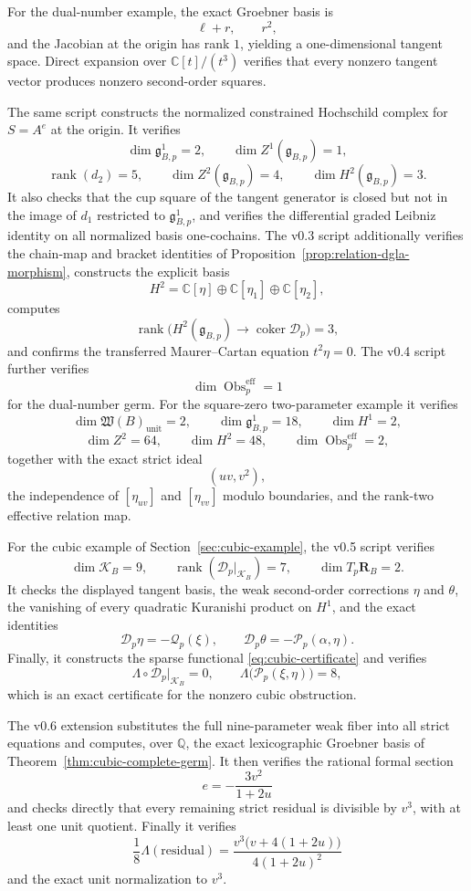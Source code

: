 \documentclass[11pt]{amsart}
\newcommand{\coker}{\operatorname{coker}}
\newcommand{\rank}{\operatorname{rank}}
\newcommand{\Obs}{\operatorname{Obs}}
\newcommand{\Wfib}{\mathfrak W}
\newcommand{\cD}{\mathscr D}
\newcommand{\cQ}{\mathscr Q}
\newcommand{\cP}{\mathscr P}
\newcommand{\C}{\mathbb C}
\newcommand{\Q}{\mathbb Q}
\newcommand{\ghoch}{\mathfrak g}
\begin{document}
For the dual-number example, the exact Groebner basis is
\[
\ell+r,\qquad r^2,
\]
and the Jacobian at the origin has rank $1$, yielding a one-dimensional tangent space.  Direct expansion over $\C[t]/(t^3)$ verifies that every nonzero tangent vector produces nonzero second-order squares.

The same script constructs the normalized constrained Hochschild complex for $S=A^e$ at the origin.  It verifies
\[
\dim\ghoch^1_{B,p}=2,
\qquad
\dim Z^1(\ghoch_{B,p})=1,
\]
\[
\rank(d_2)=5,
\qquad
\dim Z^2(\ghoch_{B,p})=4,
\qquad
\dim H^2(\ghoch_{B,p})=3.
\]
It also checks that the cup square of the tangent generator is closed but not in the image of $d_1$ restricted to $\ghoch^1_{B,p}$, and verifies the differential graded Leibniz identity on all normalized basis one-cochains.  The v0.3 script additionally verifies the chain-map and bracket identities of Proposition~\ref{prop:relation-dgla-morphism}, constructs the explicit basis
\[
H^2=\C[\eta]\oplus\C[\eta_1]\oplus\C[\eta_2],
\]
computes
\[
\rank\bigl(H^2(\ghoch_{B,p})\to\coker\cD_p\bigr)=3,
\]
and confirms the transferred Maurer--Cartan equation $t^2\eta=0$.  The v0.4 script further verifies
\[
\dim\Obs^{\mathrm{eff}}_p=1
\]
for the dual-number germ.  For the square-zero two-parameter example it verifies
\[
\dim\Wfib(B)_{\mathrm{unit}}=2,
\qquad
\dim\ghoch^1_{B,p}=18,
\qquad
\dim H^1=2,
\]
\[
\dim Z^2=64,
\qquad
\dim H^2=48,
\qquad
\dim\Obs^{\mathrm{eff}}_p=2,
\]
together with the exact strict ideal
\[
(uv,v^2),
\]
the independence of $[\eta_{uv}]$ and $[\eta_{vv}]$ modulo boundaries, and the rank-two effective relation map.

For the cubic example of Section~\ref{sec:cubic-example}, the v0.5 script verifies
\[
\dim\mathcal K_B=9,
\qquad
\rank(\cD_p|_{\mathcal K_B})=7,
\qquad
\dim T_p\mathbf R_B=2.
\]
It checks the displayed tangent basis, the weak second-order corrections $\eta$ and $\theta$, the vanishing of every quadratic Kuranishi product on $H^1$, and the exact identities
\[
\cD_p\eta=-\cQ_p(\xi),
\qquad
\cD_p\theta=-\cP_p(\alpha,\eta).
\]
Finally, it constructs the sparse functional \eqref{eq:cubic-certificate} and verifies
\[
\Lambda\circ\cD_p|_{\mathcal K_B}=0,
\qquad
\Lambda\bigl(\cP_p(\xi,\eta)\bigr)=8,
\]
which is an exact certificate for the nonzero cubic obstruction.


The v0.6 extension substitutes the full nine-parameter weak fiber into all strict equations and computes, over $\Q$, the exact lexicographic Groebner basis of Theorem~\ref{thm:cubic-complete-germ}.  It then verifies the rational formal section
\[
e=-\frac{3v^2}{1+2u}
\]
and checks directly that every remaining strict residual is divisible by $v^3$, with at least one unit quotient.  Finally it verifies
\[
\frac18\Lambda(\text{residual})
=
\frac{v^3\bigl(v+4(1+2u)\bigr)}{4(1+2u)^2}
\]
and the exact unit normalization to $v^3$.
\end{document}
